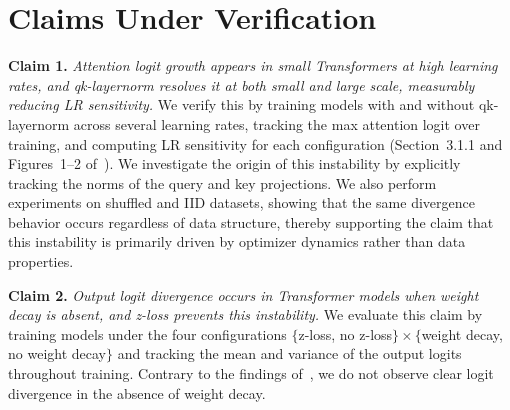 \section{Claims Under Verification}
\label{sec:claims}


\textbf{Claim 1.}
\textit{Attention logit growth appears in small Transformers at high learning
rates, and qk-layernorm resolves it at both small and large scale, measurably
reducing LR sensitivity.}
We verify this by training models with and without qk-layernorm across several
learning rates, tracking the max attention logit over training, and computing
LR sensitivity for each configuration (Section~3.1.1 and Figures~1--2
of~\cite{wortsman2023smallscale}). We investigate the origin of this instability by explicitly tracking the norms of the query and key projections. We also perform experiments on shuffled and IID datasets, showing that the same divergence behavior occurs regardless of data structure, thereby supporting the claim that this instability is primarily driven by optimizer dynamics rather than data properties.


\textbf{Claim 2.}
\textit{Output logit divergence occurs in Transformer models when weight decay is absent, and z-loss prevents this instability.} We evaluate this claim by training models under the four configurations
$\{$z-loss, no z-loss$\} \times \{$weight decay, no weight decay$\}$ and tracking the mean and variance of the output logits throughout training. Contrary to the findings of~\cite{wortsman2023smallscale}, we do not observe clear logit divergence in the absence of weight decay.
